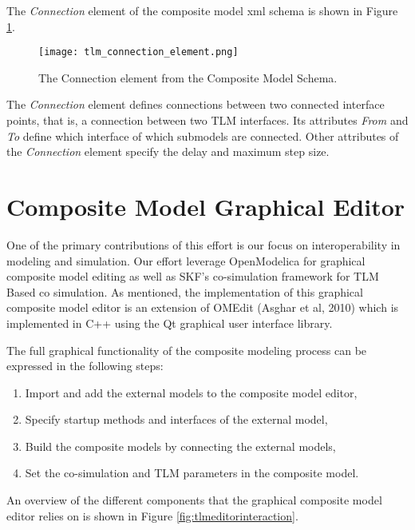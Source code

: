 The \textit{Connection} element of the composite model \acrshort{xml} schema is shown in Figure \ref{fig:tlmconnectionelement}.

\begin{figure}
	\texttt{[image: tlm\_connection\_element.png]}
	\caption{The Connection element from the Composite Model Schema.}
	\label{fig:tlmconnectionelement}
\end{figure}

The \textit{Connection} element defines connections between two connected interface points, that is, 
a connection between two TLM interfaces. Its attributes \textit{From} and \textit{To} define which interface of which submodels are connected. Other attributes of the \textit{Connection} element specify the delay and maximum step size. 

\section{Composite Model Graphical Editor}
\label{sec:tlmeditor}

One of the primary contributions of this effort is our focus on interoperability in modeling and simulation.
Our effort leverage OpenModelica for graphical composite model editing as well as SKF’s co-simulation framework for TLM Based co simulation. As mentioned, the implementation of this graphical
composite model editor is an extension of OMEdit (Asghar et al, 2010) which is implemented in C++
using the Qt graphical user interface library.

The full graphical functionality of the composite modeling process can be expressed in the following steps:

\begin{enumerate}
	
\item Import and add the external models to the composite model editor,
\item Specify startup methods and interfaces of the external model,
\item Build the composite models by connecting the external models,
\item Set the co-simulation and TLM parameters in the composite model.

\end{enumerate}

An overview of the different components that the graphical composite model editor relies on is shown in Figure \ref{fig:tlmeditorinteraction}. 

